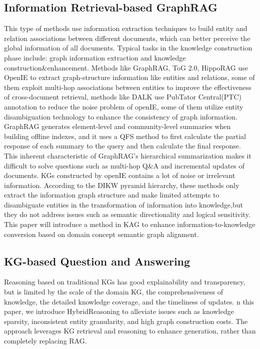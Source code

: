 \documentclass{article}
\begin{document}
\subsection{Information Retrieval-based GraphRAG}
This type of methods use information extraction techniques to build entity and relation associations between different documents, which can better perceive the global information of all documents. Typical tasks in the knowledge construction phase include: graph information extraction and knowledge construction\&enhancement. Methods like GraphRAG\cite{edge2024local}, ToG 2.0\cite{ma2024think}, HippoRAG\cite{gutierrez2024hipporag} use OpenIE to extract graph-structure information like entities and relations, some of them exploit multi-hop associations between entities to improve the effectiveness of cross-document retrieval\cite{ma2024think, gutierrez2024hipporag}, methods like DALK\cite{li2024dalk} use PubTator Central(PTC) annotation to reduce the noise problem of openIE, some of them utilize entity disambiguation technology to enhance the consistency of graph information\cite{gutierrez2024hipporag,sarmah2024hybridrag}. GraphRAG\cite{edge2024local} generates element-level and community-level summaries when building offline indexes, and it uses a QFS\cite{dang2006duc} method to first calculate the partial response of each summary to the query and then calculate the final response. This inherent characteristic of GraphRAG's hierarchical summarization makes it difficult to solve questions such as multi-hop Q\&A and incremental updates of documents. KGs constructed by openIE contains a lot of noise or irrelevant information\cite{zhang2020aser,bi2024codekgc,fang2021discos}. According to the DIKW pyramid hierarchy, these methods only extract the information graph structure and make limited attempts to disambiguate entities in the transformation of information into knowledge,but they do not address issues such as semantic directionality and logical sensitivity. This paper will introduce a method in KAG to enhance information-to-knowledge conversion based on domain concept semantic graph alignment.

\subsection{KG-based Question and Answering}
Reasoning based on traditional KGs has good explainability and transparency, but is limited by the scale of the domain KG, the comprehensiveness of knowledge, the detailed knowledge coverage, and the timeliness of updates\cite{tian2022knowledge}. n this paper, we introduce HybridReasoning to alleviate issues such as knowledge sparsity, inconsistent entity granularity, and high graph construction costs. The approach leverages KG retrieval and reasoning to enhance generation, rather than completely replacing RAG.
\end{document}
